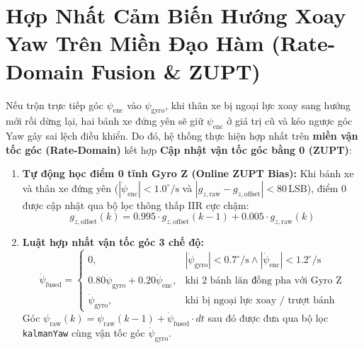 \documentclass[10pt,a4paper,twocolumn]{article}
\begin{document}
\section{Hợp Nhất Cảm Biến Hướng Xoay Yaw Trên Miền Đạo Hàm (Rate-Domain Fusion \& ZUPT)}
Nếu trộn trực tiếp góc $\psi_{\text{enc}}$ vào $\psi_{\text{gyro}}$, khi thân xe bị ngoại lực xoay sang hướng mới rồi dừng lại, hai bánh xe đứng yên sẽ giữ $\psi_{\text{enc}}$ ở giá trị cũ và kéo ngược góc Yaw gây sai lệch điều khiển. Do đó, hệ thống thực hiện hợp nhất trên \textbf{miền vận tốc góc (Rate-Domain)} kết hợp \textbf{Cập nhật vận tốc góc bằng 0 (ZUPT)}:
\begin{enumerate}
    \item \textbf{Tự động học điểm 0 tĩnh Gyro Z (Online ZUPT Bias):} Khi bánh xe và thân xe đứng yên ($|\dot{\psi}_{\text{enc}}| < 1.0^\circ/\text{s}$ và $|g_{z,\text{raw}} - g_{z,\text{offset}}| < 80\,\text{LSB}$), điểm 0 được cập nhật qua bộ lọc thông thấp IIR cực chậm:
    \begin{equation}
        g_{z,\text{offset}}(k) = 0.995 \cdot g_{z,\text{offset}}(k-1) + 0.005 \cdot g_{z,\text{raw}}(k)
    \end{equation}
    \item \textbf{Luật hợp nhất vận tốc góc 3 chế độ:}
    \begin{equation}
        \dot{\psi}_{\text{fused}} = \begin{cases}
            0, & |\dot{\psi}_{\text{gyro}}| < 0.7^\circ/\text{s} \land |\dot{\psi}_{\text{enc}}| < 1.2^\circ/\text{s} \\
            0.80\dot{\psi}_{\text{gyro}} + 0.20\dot{\psi}_{\text{enc}}, & \text{khi 2 bánh lăn đồng pha với Gyro Z} \\
            \dot{\psi}_{\text{gyro}}, & \text{khi bị ngoại lực xoay / trượt bánh}
        \end{cases}
    \end{equation}
    Góc $\psi_{\text{raw}}(k) = \psi_{\text{raw}}(k-1) + \dot{\psi}_{\text{fused}} \cdot dt$ sau đó được đưa qua bộ lọc \texttt{kalmanYaw} cùng vận tốc góc $\dot{\psi}_{\text{gyro}}$.
\end{enumerate}
\end{document}
